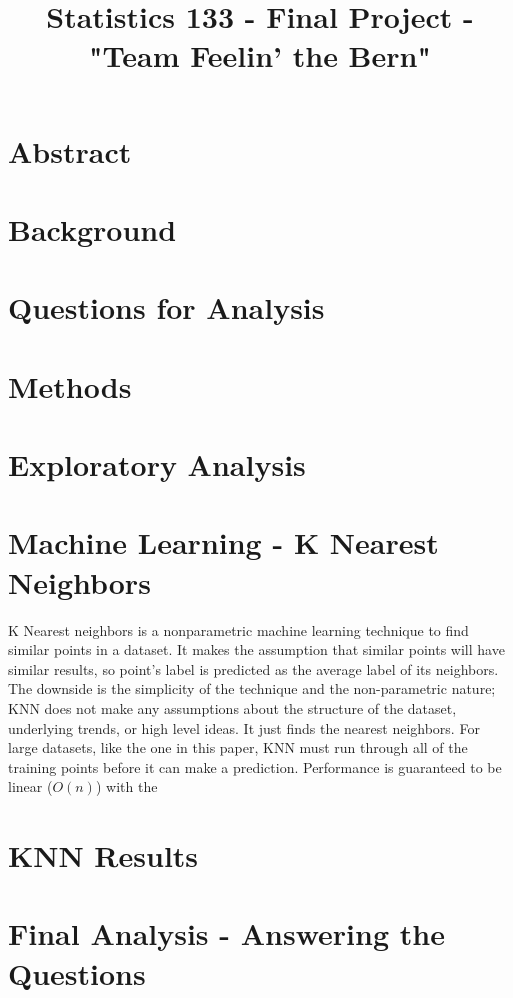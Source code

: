 \documentclass[11pt]{article}
\title{Statistics 133 - Final Project - "Team Feelin' the Bern"}
\author{\Name}
\date{}
\begin{document}
\maketitle

\section*{Abstract}


\section*{Background}

\section*{Questions for Analysis}

\section*{Methods}

\section*{Exploratory Analysis}

\section*{Machine Learning - K Nearest Neighbors}
K Nearest neighbors is a nonparametric machine learning technique to find similar points in a dataset. It makes the assumption that similar points will have similar results, so point's label is predicted as the average label of its neighbors. The downside is the simplicity of the technique and the non-parametric nature; KNN does not make any assumptions about the structure of the dataset, underlying trends, or high level ideas. It just finds the nearest neighbors. For large datasets, like the one in this paper, KNN must run through all of the training points before it can make a prediction. Performance is guaranteed to be linear ($O(n)$) with the 
\section*{KNN Results}

\section*{Final Analysis - Answering the Questions}
\end{document}
